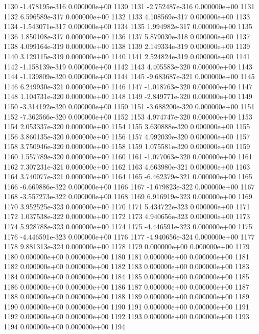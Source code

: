 \documentclass{article}
\begin{document}
\begin{Schunk}
\begin{Soutput}
1130 -1.478195e-316   0.000000e+00 1130
1131 -2.752487e-316   0.000000e+00 1131
1132  6.596589e-317   0.000000e+00 1132
1133  4.108569e-317   0.000000e+00 1133
1134 -1.543071e-317   0.000000e+00 1134
1135  1.994982e-317   0.000000e+00 1135
1136  1.850108e-317   0.000000e+00 1136
1137  5.879030e-318   0.000000e+00 1137
1138  4.099164e-319   0.000000e+00 1138
1139  2.149334e-319   0.000000e+00 1139
1140  3.129115e-319   0.000000e+00 1140
1141  2.524824e-319   0.000000e+00 1141
1142 -1.158139e-319   0.000000e+00 1142
1143  4.405583e-320   0.000000e+00 1143
1144 -1.139809e-320   0.000000e+00 1144
1145 -9.683687e-321   0.000000e+00 1145
1146  6.249930e-321   0.000000e+00 1146
1147 -1.018763e-320   0.000000e+00 1147
1148  1.104731e-320   0.000000e+00 1148
1149 -2.849771e-320   0.000000e+00 1149
1150 -3.314192e-320   0.000000e+00 1150
1151 -3.688200e-320   0.000000e+00 1151
1152 -7.362566e-320   0.000000e+00 1152
1153  4.974747e-320   0.000000e+00 1153
1154  2.053337e-320   0.000000e+00 1154
1155  3.630888e-320   0.000000e+00 1155
1156  3.860135e-320   0.000000e+00 1156
1157  4.992039e-320   0.000000e+00 1157
1158  3.750946e-320   0.000000e+00 1158
1159  1.075581e-320   0.000000e+00 1159
1160  1.557789e-320   0.000000e+00 1160
1161 -1.077063e-320   0.000000e+00 1161
1162  7.307231e-321   0.000000e+00 1162
1163  4.663980e-321   0.000000e+00 1163
1164  3.740077e-321   0.000000e+00 1164
1165 -6.462379e-321   0.000000e+00 1165
1166 -6.669886e-322   0.000000e+00 1166
1167 -1.679823e-322   0.000000e+00 1167
1168 -3.557273e-322   0.000000e+00 1168
1169  6.916919e-323   0.000000e+00 1169
1170  3.952525e-323   0.000000e+00 1170
1171  5.434722e-323   0.000000e+00 1171
1172  1.037538e-322   0.000000e+00 1172
1173  4.940656e-323   0.000000e+00 1173
1174  5.928788e-323   0.000000e+00 1174
1175 -4.446591e-323   0.000000e+00 1175
1176 -4.446591e-323   0.000000e+00 1176
1177 -4.940656e-324   0.000000e+00 1177
1178  9.881313e-324   0.000000e+00 1178
1179   0.000000e+00   0.000000e+00 1179
1180   0.000000e+00   0.000000e+00 1180
1181   0.000000e+00   0.000000e+00 1181
1182   0.000000e+00   0.000000e+00 1182
1183   0.000000e+00   0.000000e+00 1183
1184   0.000000e+00   0.000000e+00 1184
1185   0.000000e+00   0.000000e+00 1185
1186   0.000000e+00   0.000000e+00 1186
1187   0.000000e+00   0.000000e+00 1187
1188   0.000000e+00   0.000000e+00 1188
1189   0.000000e+00   0.000000e+00 1189
1190   0.000000e+00   0.000000e+00 1190
1191   0.000000e+00   0.000000e+00 1191
1192   0.000000e+00   0.000000e+00 1192
1193   0.000000e+00   0.000000e+00 1193
1194   0.000000e+00   0.000000e+00 1194

\end{Soutput}
\end{Schunk}
\end{document}
